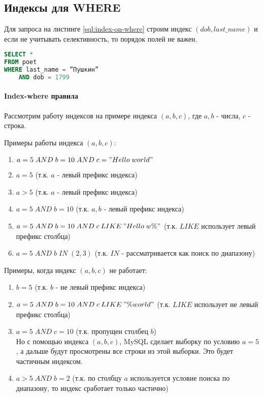 \subsection{Индексы для WHERE}

Для запроса на листинге \ref{sql:index-on-where} строим индекс $(dob, last\_name)$ и если не учитывать селективность, то порядок полей не важен.
\begin{lstlisting}[language=sql, label=sql:index-on-where, caption={запрос для index-on-where}]
SELECT * 
FROM poet
WHERE last_name = ”Пушкин” 
    AND dob = 1799
\end{lstlisting}

\paragraph{Index-where правила}

Рассмотрим работу индексов на примере индекса $(a, b, c)$, где $a, b$ - числа, $c$ - строка.

Примеры работы индекса $(a, b, c)$:
\begin{enumerate}
\item $a = 5 \; AND \; b = 10 \; AND \; c="Hello\;world"$
\item $a = 5$ (т.к. $a$ - левый префикс индекса)
\item $a > 5$ (т.к. $a$ - левый префикс индекса)  
\item $a = 5 \; AND \; b = 10$ (т.к. $a, b$ - левый префикс индекса)       
\item $a = 5 \; AND \; b = 10 \; AND \; c\:LIKE\:"Hello\;w\%"$ (т.к. $LIKE$ использует левый префикс столбца)
\item $a = 5 \; AND \; b \; IN \; (2,3)$ (т.к. $IN$ - рассматривается как поиск по диапазону)
\end{enumerate}

Примеры, когда индекс $(a, b, c)$ не работает:
\begin{enumerate}
\item $b = 5$ (т.к. $b$ - не левый префикс индекса)
\item $a=5 \; AND \; b=10 \; AND \; c\:LIKE\:"\% world"$ (т.к. $LIKE$ использует не левый префикс столбца)
\item $a=5 \; AND \; c=10$ (т.к. пропущен столбец $b$) \\
Но с помощью индекса $(a, b, c)$, MySQL сделает выборку по условию $a=5$, а дальше будут просмотрены все строки из этой выборки. Это будет частичным индексом.
\item $a>5 \; AND \; b=2$ (т.к. по столбцу $a$ используется условие поиска по диапазону, то индекс сработает только частично)
\end{enumerate}

